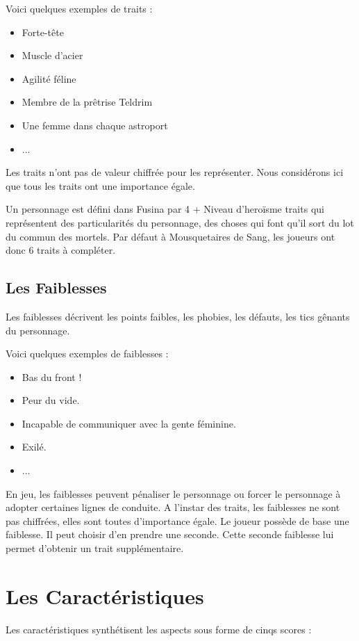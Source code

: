 \begin{multicols}{2}
Voici quelques exemples de traits :
\begin{itemize}
\item Forte-tête 
\item Muscle d'acier
\item Agilité féline
\item Membre de la prêtrise Teldrim
\item Une femme dans chaque astroport
\item ...
\end{itemize}

Les traits n'ont pas de valeur chiffrée pour les représenter. Nous considérons ici que tous les traits ont une importance égale.

Un personnage est défini dans Fusina par 4 + Niveau d'heroïsme traits qui représentent des particularités du personnage, des choses qui font qu'il sort du lot du commun des mortels. Par défaut à Mousquetaires de Sang, les joueurs ont donc 6 traits à compléter.

\subsection{Les Faiblesses}

Les faiblesses décrivent les points faibles, les phobies, les défauts, les tics gênants du personnage.

Voici quelques exemples de faiblesses :
\begin{itemize}
\item Bas du front !
\item Peur du vide.
\item Incapable de communiquer avec la gente féminine.
\item Exilé.
\item ...
\end{itemize}

En jeu, les faiblesses peuvent pénaliser le personnage ou forcer le personnage à adopter certaines lignes de conduite. A l'instar des traits, les faiblesses ne sont pas chiffrées, elles sont toutes d'importance égale.
Le joueur possède de base une faiblesse. Il peut choisir d'en prendre une seconde. Cette seconde faiblesse lui permet d'obtenir un trait supplémentaire.

\section{Les Caractéristiques}

Les caractéristiques synthétisent les aspects sous forme de cinqs scores :


\end{multicols}
